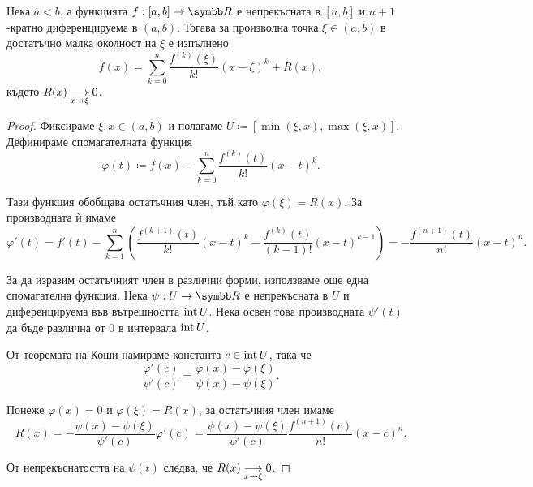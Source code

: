 \documentclass[
  headings=standardclasses,
  bibliography=totocnumbered,
]{scrartcl}
\begin{document}
\begin{theorem}[Тейлър]
  Нека \( a < b \), а функцията \( f: [a, b] \to \R \) е непрекъсната в \( [a, b] \) и \( n+1 \)-кратно диференцируема в \( (a, b) \). Тогава за произволна точка \( \xi \in (a, b) \) в достатъчно малка околност на \( \xi \) е изпълнено
  \begin{equation*}
    f(x) = \sum_{k=0}^n \frac {f^{(k)}(\xi)} {k!} {(x-\xi)}^k + R(x),
  \end{equation*}
  където \( R(x) \Conv[x \to \xi]{} 0 \).
\end{theorem}
\begin{proof}
  Фиксираме \( \xi, x \in (a, b) \) и полагаме \( U \coloneqq [\min(\xi, x), \max(\xi, x)] \). Дефинираме спомагателната функция
  \begin{equation*}
    \varphi(t) \coloneqq f(x) - \sum_{k=0}^n \frac {f^{(k)}(t)} {k!} {(x-t)}^k.
  \end{equation*}

  Тази функция обобщава остатъчния член, тъй като \( \varphi(\xi) = R(x) \). За производната ѝ имаме
  \begin{equation*}
    \varphi'(t)
    =
    f'(t) -\sum_{k=1}^n \left( \frac {f^{(k+1)}(t)} {k!} {(x-t)}^k - \frac {f^{(k)}(t)} {(k-1)!} {(x-t)}^{k-1} \right)
    =
    - \frac {f^{(n+1)}(t)} {n!} {(x-t)}^n.
  \end{equation*}

  За да изразим остатъчният член в различни форми, използваме още една спомагателна функция. Нека \( \psi: U \to \R \) е непрекъсната в \( U \) и диференцируема във вътрешността \( \Int U \). Нека освен това производната \( \psi'(t) \) да бъде различна от \( 0 \) в интервала \( \Int U \).

  От теоремата на Коши намираме константа \( c \in \Int U \), така че
  \begin{equation*}
    \frac {\varphi'(c)} {\psi'(c)}
    =
    \frac {\varphi(x) - \varphi(\xi)} {\psi(x) - \psi(\xi)}.
  \end{equation*}

  Понеже \( \varphi(x) = 0 \) и \( \varphi(\xi) = R(x) \), за остатъчния член имаме
  \begin{equation*}
    R(x)
    =
    -\frac {\psi(x) - \psi(\xi)} {\psi'(c)} \varphi'(c)
    =
    \frac {\psi(x) - \psi(\xi)} {\psi'(c)} \frac {f^{(n+1)}(c)} {n!} {(x-c)}^n.
  \end{equation*}

  От непрекъснатостта на \( \psi(t) \) следва, че \( R(x) \Conv[x \to \xi]{} 0 \).
\end{proof}
\end{document}
